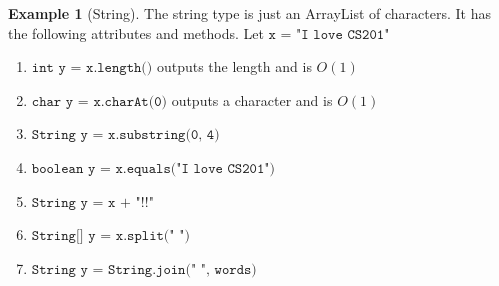 \documentclass{article}
\theoremstyle{definition}
\newtheorem{example}{Example}[section]
\theoremstyle{remark}
\theoremstyle{definition}
\begin{document}
\begin{example}[String]
The string type is just an ArrayList of characters. It has the following attributes and methods. Let $\texttt{x = "I love CS201"}$ 
\begin{enumerate}
    \item $\texttt{int y = x.length()}$ outputs the length and is $O(1)$ 
    \item $\texttt{char y = x.charAt(0)}$ outputs a character and is $O(1)$
    \item $\texttt{String y = x.substring(0, 4)}$ 
    \item $\texttt{boolean y = x.equals("I love CS201")}$
    \item $\texttt{String y = x + "!!"}$ 
    \item $\texttt{String[] y = x.split(" ")}$
    \item $\texttt{String y = String.join(" ", words)}$
\end{enumerate}
\end{example}
\end{document}

